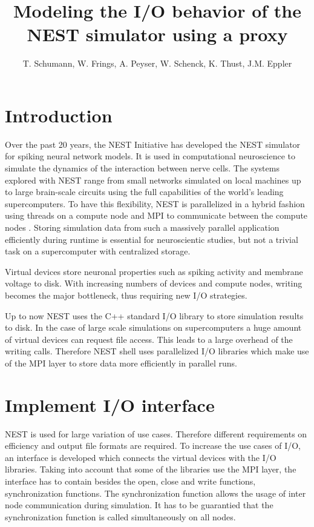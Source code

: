 \documentclass[]{YIC2015}
\title{Modeling the I/O behavior of the NEST simulator using a proxy}
\author[T. Schumann et al.]{%
  T. Schumann\authref{a}\corref,
  W. Frings\authref{b},
  A. Peyser\authref{c},
  W. Schenck\authref{c},
  K. Thust\authref{b},
  J.M. Eppler\authref{c}
}
\begin{document}
\maketitle

\section{Introduction}
%
Over the past 20 years, the NEST Initiative \cite{NESTInitiative} has developed the NEST
\cite{NEST} simulator for spiking neural network models. It is used in
computational neuroscience to simulate the dynamics of the interaction
between nerve cells. The systems explored with NEST range from small
networks simulated on local machines up to large brain-scale circuits
using the full capabilities of the world's leading supercomputers. To
have this flexibility, NEST is parallelized in a hybrid fashion
using threads on a compute node and MPI to communicate between the
compute nodes \cite{Plesser07}.  Storing simulation data from such a
massively parallel application efficiently during runtime is essential
for neuroscientic studies, but not a trivial task on a supercomputer
with centralized storage.

Virtual devices store neuronal properties such as spiking activity
and membrane voltage to disk. With increasing numbers of devices and
compute nodes, writing becomes the major bottleneck, thus requiring
new I/O strategies.

Up to now NEST uses the C++ standard I/O library to store simulation results to disk.
In the case of large scale simulations on supercomputers a huge amount of virtual devices can request file access.
This leads to a large overhead of the writing calls.
Therefore NEST shell uses parallelized I/O libraries which make use of the MPI layer to store data more efficiently in parallel runs.
\section{Implement I/O interface}
NEST is used for large variation of use cases.
Therefore different requirements on efficiency and output file formats are required.
To increase the use cases of I/O, an interface is developed which connects the virtual devices with the I/O libraries.
Taking into account that some of the libraries use the MPI layer,
the interface has to contain besides the open, close and write functions, synchronization functions.
The synchronization function allows the usage of inter node communication during simulation.
It has to be guarantied that the synchronization function is called simultaneously on all nodes.
\end{document}
